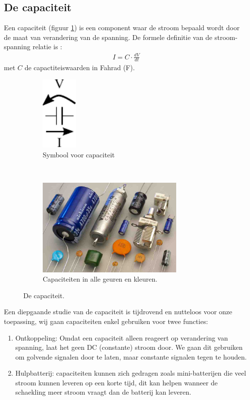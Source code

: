 \documentclass{article}
\begin{document}
		\subsection{De capaciteit}
		Een capaciteit (figuur \ref{fig:capaciteit}) is een component waar de stroom bepaald wordt door de maat van verandering van de spanning. De formele definitie van de stroom-spanning relatie is :
		\begin{align}
		    I = C \cdot \frac{dV}{dt}
		\end{align}
		met $C$ de capactiteiswaarden in Fahrad (F). 
		\begin{figure}[htbp!]
			\centering
			\begin{subfigure}[b]{0.45\linewidth}
				\centering
				\includegraphics[width=0.2\textwidth]{cap}
				\caption{Symbool voor capaciteit}
			\end{subfigure}
			~
			\begin{subfigure}[b]{0.45\linewidth}
				\centering
				\includegraphics[width=0.8\textwidth]{caps}
				\caption{Capaciteiten in alle geuren en kleuren.}
			\end{subfigure}
		\caption{De capaciteit.}
		\label{fig:capaciteit}
		\end{figure}
		Een diepgaande studie van de capaciteit is tijdrovend en nutteloos voor onze toepassing, wij gaan capaciteiten enkel  gebruiken voor twee functies:
		\begin{enumerate}
			\item Ontkoppeling: Omdat een capaciteit alleen reageert op verandering van spanning, laat het geen DC (constante) stroom door. We gaan dit gebruiken om golvende signalen door te laten, maar constante signalen tegen te houden.
			\item Hulpbatterij: capaciteiten kunnen zich gedragen zoals mini-batterijen die veel stroom kunnen leveren op een korte tijd, dit kan helpen wanneer de schaekling meer stroom vraagt dan de batterij kan leveren.
		\end{enumerate}
\end{document}

